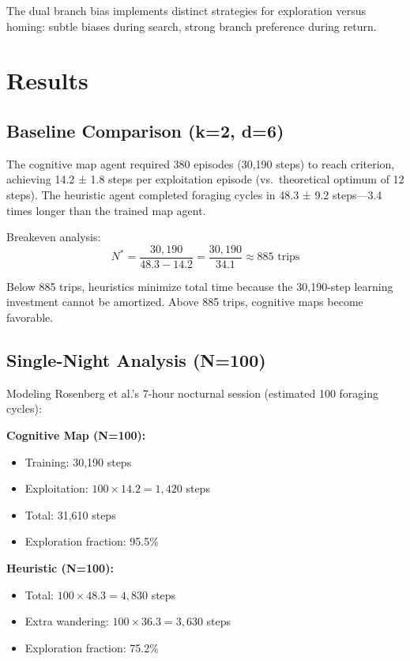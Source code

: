 The dual branch bias implements distinct strategies for exploration versus homing: subtle biases during search, strong branch preference during return.

\section{Results}

\subsection{Baseline Comparison (k=2, d=6)}

The cognitive map agent required 380 episodes (30,190 steps) to reach criterion, achieving 14.2 ± 1.8 steps per exploitation episode (vs.\ theoretical optimum of 12 steps). The heuristic agent completed foraging cycles in 48.3 ± 9.2 steps—3.4 times longer than the trained map agent.

Breakeven analysis:
\[
N^* = \frac{30,190}{48.3 - 14.2} = \frac{30,190}{34.1} \approx 885 \text{ trips}
\]

Below 885 trips, heuristics minimize total time because the 30,190-step learning investment cannot be amortized. Above 885 trips, cognitive maps become favorable.

\subsection{Single-Night Analysis (N=100)}

Modeling Rosenberg et al.'s 7-hour nocturnal session (estimated 100 foraging cycles):

\textbf{Cognitive Map (N=100):}
\begin{itemize}[noitemsep,topsep=0pt]
    \item Training: 30,190 steps
    \item Exploitation: $100 \times 14.2 = 1,420$ steps
    \item Total: 31,610 steps
    \item Exploration fraction: 95.5\%
\end{itemize}

\textbf{Heuristic (N=100):}
\begin{itemize}[noitemsep,topsep=0pt]
    \item Total: $100 \times 48.3 = 4,830$ steps
    \item Extra wandering: $100 \times 36.3 = 3,630$ steps
    \item Exploration fraction: 75.2\%
\end{itemize}

